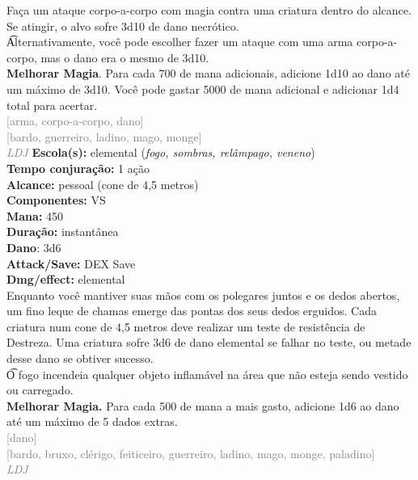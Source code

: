 \documentclass{RPG_Adventure}[2021/10/20]
\begin{document}
{\normalsize Faça um ataque corpo-a-corpo com magia contra uma criatura dentro do alcance. Se atingir, o alvo sofre 3d10 de dano necrótico.\\\t Alternativamente, você pode escolher fazer um ataque com uma arma corpo-a-corpo, mas o dano era o mesmo de 3d10.\\\t \textbf{Melhorar Magia}. Para cada 700 de mana adicionais, adicione 1d10 ao dano até um máximo de 3d10. Você pode gastar 5000 de mana adicional e adicionar 1d4 total para acertar.\\}
{\scriptsize \textcolor{gray}{[arma, corpo-a-corpo, dano]\\}}
{\scriptsize \textcolor{gray}{[bardo, guerreiro, ladino, mago, monge]\\}}
{\tiny \textcolor{gray}{\textit{LDJ}}}
{\small \t \textbf{Escola(s):} elemental (\textit{fogo, sombras, relâmpago, veneno})\\\t \textbf{Tempo conjuração:} 1 ação\\\t \textbf{Alcance:} pessoal (cone de 4,5 metros)\\\t \textbf{Componentes:} VS\\\t \textbf{Mana:} 450\\\t \textbf{Duração:} instantânea\\\t \textbf{Dano}: 3d6\\\t \textbf{Attack/Save:} DEX Save\\\t \textbf{Dmg/effect:} elemental\\}
{\normalsize Enquanto você mantiver suas mãos com os polegares juntos e os dedos abertos, um fino leque de chamas emerge das pontas dos seus dedos erguidos. Cada criatura num cone de 4,5 metros deve realizar um teste de resistência de Destreza. Uma criatura sofre 3d6 de dano elemental se falhar no teste, ou metade desse dano se obtiver sucesso.\\\t O fogo incendeia qualquer objeto inflamável na área que não esteja sendo vestido ou carregado.\\\t \textbf{Melhorar Magia.} Para cada 500 de mana a mais gasto, adicione 1d6 ao dano até um máximo de 5 dados extras.\\}
{\scriptsize \textcolor{gray}{[dano]\\}}
{\scriptsize \textcolor{gray}{[bardo, bruxo, clérigo, feiticeiro, guerreiro, ladino, mago, monge, paladino]\\}}
{\tiny \textcolor{gray}{\textit{LDJ}}}
\end{document}

